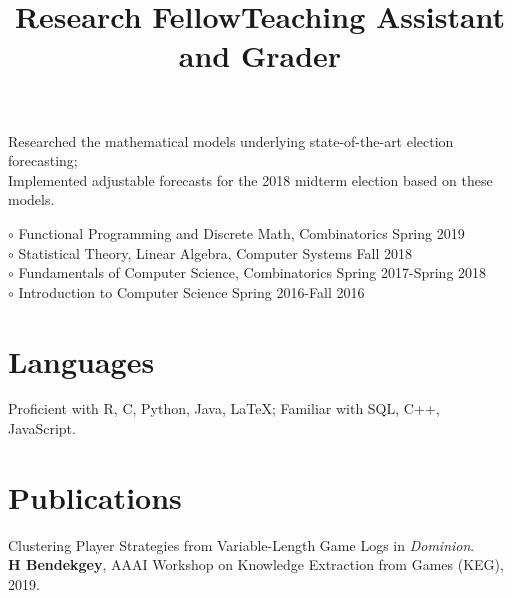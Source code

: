 \documentclass[margin]{res}
\begin{document}
\begin{resume}
\title{\textbf{Research Fellow}}
\begin{position}
Researched the mathematical models underlying state-of-the-art election forecasting;\\
Implemented adjustable forecasts for the 2018 midterm election based on these models.
\end{position}

\dates{}
\title{\textbf{Teaching Assistant and Grader}}
\begin{position}
$\circ$  Functional Programming and Discrete Math, Combinatorics \hfill Spring 2019\\
$\circ$ Statistical Theory, Linear Algebra, Computer Systems \hfill Fall 2018\\
$\circ$  Fundamentals of Computer Science, Combinatorics \hfill Spring 2017-Spring 2018\\
$\circ$ Introduction to Computer Science \hfill Spring 2016-Fall 2016
\end{position}



\section{Languages}

Proficient with R, C, Python, Java, \LaTeX; Familiar with SQL, C++, JavaScript.


\section{Publications}
\par
Clustering Player Strategies from Variable-Length Game Logs in \emph{Dominion}.\\ \textbf{H Bendekgey}, AAAI Workshop on Knowledge Extraction from Games (KEG), 2019.


\end{resume}
\end{document}

